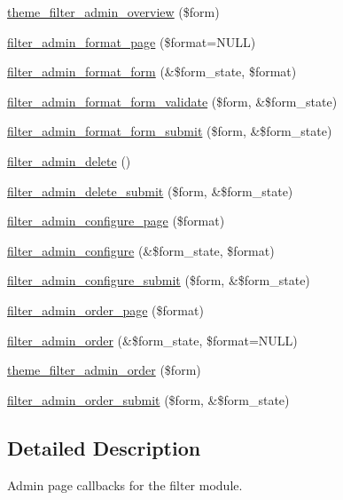 \begin{CompactItemize}
\item 
\hyperlink{group__themeable_gb75dc6c3bff3b14c9d8decc0bdf65cf1}{theme\_\-filter\_\-admin\_\-overview} (\$form)
\item 
\hyperlink{filter_8admin_8inc_ad02098c7cd9b370e0692fb74f498706}{filter\_\-admin\_\-format\_\-page} (\$format=NULL)
\item 
\hyperlink{group__forms_gfa40bd6f3659ac2e8980f5b30d263ab2}{filter\_\-admin\_\-format\_\-form} (\&\$form\_\-state, \$format)
\item 
\hyperlink{filter_8admin_8inc_1ae5e99340abc69aadeff9d2a538d578}{filter\_\-admin\_\-format\_\-form\_\-validate} (\$form, \&\$form\_\-state)
\item 
\hyperlink{filter_8admin_8inc_1cabbcac9ccc4de52ea16a64a8c8cd54}{filter\_\-admin\_\-format\_\-form\_\-submit} (\$form, \&\$form\_\-state)
\item 
\hyperlink{group__forms_g950ad134c292688bc709871c65745dda}{filter\_\-admin\_\-delete} ()
\item 
\hyperlink{filter_8admin_8inc_280611f74f59bc785a6fd35fae0ed8d3}{filter\_\-admin\_\-delete\_\-submit} (\$form, \&\$form\_\-state)
\item 
\hyperlink{filter_8admin_8inc_73c7cd94e9aa604197745aeda599bf43}{filter\_\-admin\_\-configure\_\-page} (\$format)
\item 
\hyperlink{group__forms_gcc23b948cf6b65bf3fb1febee5a51beb}{filter\_\-admin\_\-configure} (\&\$form\_\-state, \$format)
\item 
\hyperlink{filter_8admin_8inc_2e8e2b234ba63aab2f16b2dd0313e5f8}{filter\_\-admin\_\-configure\_\-submit} (\$form, \&\$form\_\-state)
\item 
\hyperlink{filter_8admin_8inc_46f1de68199cbb6be953d33cea19967f}{filter\_\-admin\_\-order\_\-page} (\$format)
\item 
\hyperlink{group__forms_g6f9ec0dfed0e7f095f0f99f731d084be}{filter\_\-admin\_\-order} (\&\$form\_\-state, \$format=NULL)
\item 
\hyperlink{group__themeable_g2043f70c09f1b97fed7917c783bb774c}{theme\_\-filter\_\-admin\_\-order} (\$form)
\item 
\hyperlink{filter_8admin_8inc_b784a456f8aaeddc16e19018b80042b0}{filter\_\-admin\_\-order\_\-submit} (\$form, \&\$form\_\-state)
\end{CompactItemize}


\subsection{Detailed Description}
Admin page callbacks for the filter module. 

